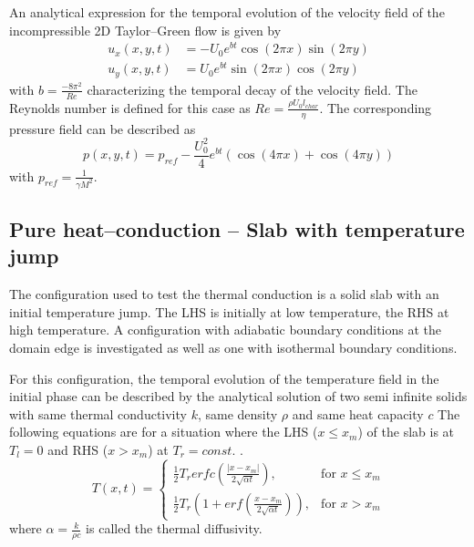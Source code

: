 \documentclass{report}
\begin{document}
An analytical expression for the temporal evolution of the velocity field of the incompressible 2D Taylor--Green flow is given by \cite{Chaniotis2002}
\begin{equation}
 \label{eq:TG_analyticalSolution_u}
\begin{split}
u_x(x,y,t)&=-U_0 e^{bt}\cos(2\pi x)\sin(2\pi y)\\
u_y(x,y,t)&=U_0 e^{bt}\sin(2\pi x)\cos(2\pi y)
\end{split}
\end{equation}
with $b=\frac{-8\pi^2}{Re}$ characterizing the temporal decay of the velocity field. The Reynolds number is defined for this case as $Re=\frac{\rho U_0 l_\mathit{char}}{\eta}$.
The corresponding pressure field can be described as 
\begin{equation}
\label{eq:TG_analyticalSolution_p}
p(x,y,t)=p_\mathit{ref} -\frac{U_0^2}{4} e^{bt}\left(\cos(4\pi x)+\cos(4\pi y)\right)
\end{equation}
with $p_\mathit{ref}=\frac{1}{\gamma M^2}$.



\subsection{Pure heat--conduction -- Slab with temperature jump}
\label{sec:genIntro_PureHeat}
The configuration used to test the thermal conduction is a solid slab with an initial temperature jump. The LHS is initially at low temperature, the RHS at high temperature. A configuration with adiabatic boundary conditions at the domain edge is investigated as well as one with isothermal boundary conditions.

For this configuration, the temporal evolution of the temperature field in the initial phase can be described by the analytical solution of two semi infinite solids with same thermal conductivity $k$, same density $\rho$ and same heat capacity $c$ %
The following equations are for a situation where the LHS ($x \leq x_m$) of the slab is at $T_l=0$ and RHS ($x > x_m$) at $T_r=const.$ \cite{Carslaw1959}.
\begin{equation}
\label{eq:Two_SemiInfBodies}
 T(x,t)=\begin{cases}
\frac{1}{2} T_r erfc\left(\frac{|x-x_m|}{2\sqrt{\alpha t}}\right),& \text{for  $x\leq x_m$} \\
\frac{1}{2} T_r\left(1+erf\left(\frac{x-x_m}{2\sqrt{\alpha t}}\right)\right),& \text{for  $x> x_m$}
\end{cases}
\end{equation}
where $\alpha=\frac{k}{\rho c}$ is called the thermal diffusivity. 
\end{document}
